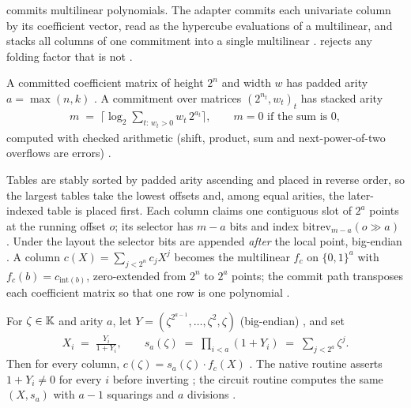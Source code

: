  commits multilinear polynomials. The adapter
 commits each univariate column by its coefficient vector, read
as the hypercube evaluations of a multilinear, and stacks all columns of one
commitment into a single multilinear .
 rejects any folding factor that is not 
.

\begin{definition}
\label{def:ps-stack}
A committed coefficient matrix of height $2^{n}$ and width $w$ has padded arity
$a = \max(n, k)$ .
A commitment over matrices $(2^{n_t}, w_t)_t$ has stacked arity
\begin{align}
  m \;=\; \Big\lceil \log_2 \sum_{t:\,w_t>0} w_t \, 2^{a_t} \Big\rceil,
  \qquad m = 0 \text{ if the sum is } 0,
\end{align}
computed with checked arithmetic (shift, product, sum and next-power-of-two
overflows are errors) .
\end{definition}

\begin{definition}
\label{def:ps-layout}
Tables are stably sorted by padded arity ascending and placed in reverse order,
so the largest tables take the lowest offsets and, among equal arities, the
later-indexed table is placed first. Each column claims one contiguous slot of
$2^{a}$ points at the running offset $o$; its selector has $m - a$ bits and index
$\mathrm{bitrev}_{m-a}(o \gg a)$ . Under the
 layout the selector bits are appended \emph{after} the local
point, big-endian . A column $c(X)=\sum_{j<2^n} c_j X^j$
becomes the multilinear $f_c$ on $\{0,1\}^{a}$ with $f_c(b) = c_{\mathrm{int}(b)}$,
zero-extended from $2^n$ to $2^a$ points; the commit path transposes each
coefficient matrix so that one  row is one polynomial
 .
\end{definition}

\begin{definition}
\label{def:ps-bridge}
For $\zeta \in \mathbb{K}$ and arity $a$, let
$Y = (\zeta^{2^{a-1}}, \dots, \zeta^{2}, \zeta)$ (big-endian)
, and set
\begin{align}
  X_i \;=\; \frac{Y_i}{1+Y_i}, \qquad
  s_a(\zeta) \;=\; \prod_{i<a} (1+Y_i) \;=\; \sum_{j<2^a} \zeta^{j}.
\end{align}
Then for every column, $c(\zeta) = s_a(\zeta)\cdot f_c(X)$
. The native
routine asserts $1+Y_i \ne 0$ for every $i$ before inverting
; the circuit routine computes the same
$(X, s_a)$ with $a-1$ squarings and $a$ divisions .
\end{definition}

